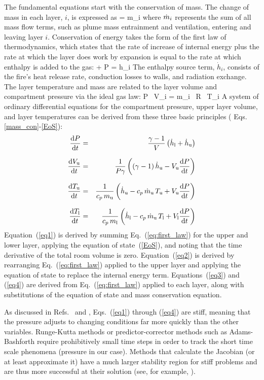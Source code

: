 \documentclass[12pt]{book}
\begin{document}
The fundamental equations start with the conservation of mass. The change of mass in each layer, $i$, is expressed as
\be
    = \dot m_i  \label{mass_con}
\ee
where $\dot{m}_i$ represents the sum of all mass flow terms, such as plume mass entrainment and ventilation, entering and leaving layer $i$. Conservation of energy takes the form of the first law of thermodynamics, which states that the rate of increase of internal energy plus the rate at which the layer does work by expansion is equal to the rate at which enthalpy is added to the gas:
\be
    +  P  =  \dot h_i \label{eq:first_law}
\ee
The enthalpy source term, $\dot h_i$, consists of the fire's heat release rate, conduction losses to walls, and radiation exchange. The layer temperature and mass are related to the layer volume and compartment pressure via the ideal gas law:
\be
  P \, V_i = m_i \, R \, T_i \label{EoS}
\ee
A system of ordinary differential equations for the compartment pressure, upper layer volume, and layer temperatures can be derived from these three basic principles ( Eqs. \ref{mass_con}-\ref{EoS}):
\begin{eqnarray}
\frac{\mathrm{d} {P}}{\mathrm{d} t} &=& \frac{{\gamma-1}}{{V}} \left( \dot{h}_{\rm l} + \dot{h}_{\rm u} \right)  \label{eq1} \\[.1in]
\frac{\mathrm{d} {V_{\rm u}}}{\mathrm{d} t} &=& \frac{1}{P \gamma} \left( (\gamma-1) \, \dot{h}_{\rm u} - V_{\rm u} \frac{\mathrm{d} {P}}{\mathrm{d} t} \right) \label{eq2} \\[.1in]
\frac{\mathrm{d} {T_{\rm u}}}{\mathrm{d} t} &=& \frac{1}{c_p \, m_{\rm u}} \left( \dot{h}_{\rm u} - c_p \, \dot{m}_{\rm u} \, T_{\rm u} + V_{\rm u} \frac{\mathrm{d} {P}}{\mathrm{d} t} \right) \label{eq3} \\[.1in]
\frac{\mathrm{d} {T_{\rm l}}}{\mathrm{d} t} &=& \frac{1}{c_p \, m_{\rm l}} \left( \dot{h}_{\rm l} - c_p \, \dot{m}_{\rm u} \, T_{\rm l} + V_{\rm l} \frac{\mathrm{d} {P}}{\mathrm{d} t} \right) \label{eq4}
\end{eqnarray}
Equation~(\ref{eq1}) is derived by summing Eq.~(\ref{eq:first_law}) for the upper and lower layer, applying the equation of state~(\ref{EoS}), and noting that the time derivative of the total room volume is zero. Equation~(\ref{eq2}) is derived by rearranging Eq.~(\ref{eq:first_law}) applied to the upper layer and applying the equation of state to replace the internal energy term. Equations~(\ref{eq3}) and (\ref{eq4}) are derived from Eq.~(\ref{eq:first_law}) applied to each layer, along with substitutions of the equation of state and mass conservation equation.

As discussed in Refs.~\cite{Forney:1994} and \cite{Rehm:1992}, Eqs.~(\ref{eq1}) through (\ref{eq4}) are stiff, meaning that the pressure adjusts to changing conditions far more quickly than the other variables. Runge-Kutta methods or predictor-corrector methods such as Adams-Bashforth require prohibitively small time steps in order to track the short time scale phenomena (pressure in our case). Methods that calculate the Jacobian (or at least approximate it) have a much larger stability region for stiff problems and are thus more successful at their solution (see, for example, \cite{Numerical_Recipes}).
\end{document}

